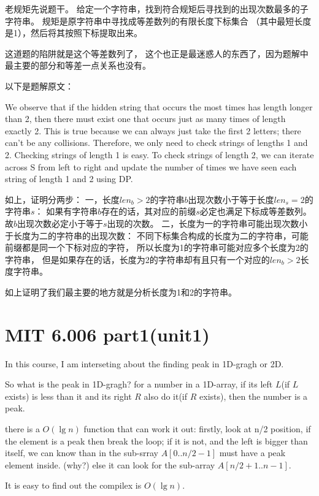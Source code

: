 老规矩先说题干。
给定一个字符串，找到符合规矩后寻找到的出现次数最多的子字符串。
规矩是原字符串中寻找成等差数列的有限长度下标集合
（其中最短长度是1），然后将其按照下标提取出来。

这道题的陷阱就是这个等差数列了，
这个也正是最迷惑人的东西了，因为题解中最主要的部分和等差一点关系也没有。

以下是题解原文：

We observe that if the hidden string that occurs the most times has length
longer than 2, then there must exist one that occurs just as many times of
length exactly 2. This is true because we can always just take the first 2
letters; there can't be any collisions. Therefore, we only need to check strings
of lengths 1 and 2. Checking strings of length 1 is easy. To check strings of
length 2, we can iterate across S from left to right and update the number of
times we have seen each string of length 1 and 2 using DP.

如上，证明分两步：
一，长度$len_b>2$的字符串$b$出现次数小于等于长度$len_s=2$的字符串$s$：
如果有字符串$b$存在的话，其对应的前缀$s$必定也满足下标成等差数列。
故$b$出现次数必定小于等于$s$出现的次数。
二，长度为一的字符串可能出现次数小于长度为二的字符串的出现次数：
不同下标集合构成的长度为二的字符串，可能前缀都是同一个下标对应的字符，
所以长度为1的字符串可能对应多个长度为2的字符串，
但是如果存在的话，长度为2的字符串却有且只有一个对应的$len_b>2$长度字符串。

如上证明了我们最主要的地方就是分析长度为1和2的字符串。


\section{MIT 6.006 part1(unit1)}

In this course, I am interseting about the finding peak in 1D-gragh or 2D.

So what is the peak in 1D-gragh?
for a number in a 1D-array, if its left $L$(if $L$ exists) is less than it and its
right $R$ also do it(if $R$ exists), then the number is a peak.

there is a $O(\lg n)$ function that can work it out:
firstly, look at n/2 position, if the element is a peak then break the loop;
if it is not, and the left is bigger than itself, we can know than in the
sub-srray $A[0..n/2-1]$ must have a peak element inside. (why?)
else it can look for the sub-array $A[n/2+1..n-1]$.

It is easy to find out the compilex is $O(\lg n)$.

